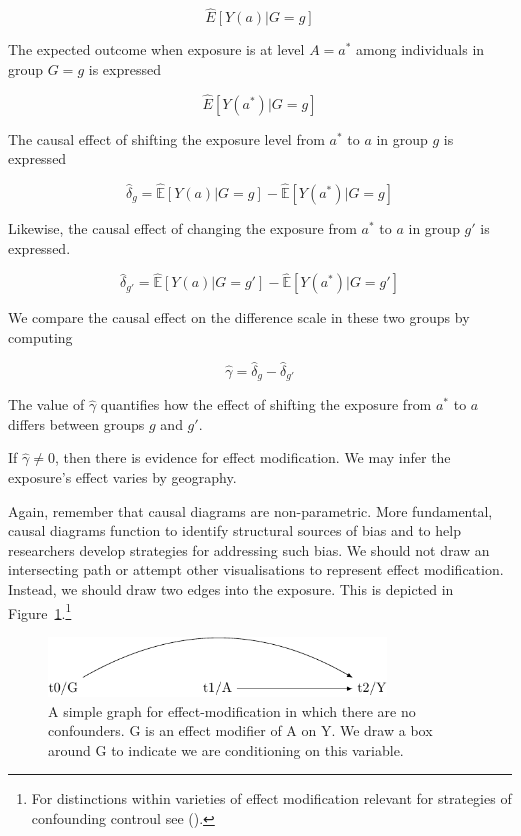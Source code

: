 \documentclass[
  singlecolumn,
  9pt]{article}
\begin{document}
\[\hat{E}[Y(a)|G=g]\]

The expected outcome when exposure is at level \(A=a^*\) among
individuals in group \(G=g\) is expressed

\[\hat{E}[Y(a^*)|G=g]\]

The causal effect of shifting the exposure level from \(a^*\) to \(a\)
in group \(g\) is expressed

\[\hat{\delta}_g = \hat{\mathbb{E}}[Y(a)|G=g] - \hat{\mathbb{E}}[Y(a^*)|G=g]\]

Likewise, the causal effect of changing the exposure from \(a^*\) to
\(a\) in group \(g'\) is expressed.

\[\hat{\delta}_{g'} = \hat{\mathbb{E}}[Y(a)|G=g'] - \hat{\mathbb{E}}[Y(a^*)|G=g']\]

We compare the causal effect on the difference scale in these two groups
by computing

\[\hat{\gamma} = \hat{\delta}_g - \hat{\delta}_{g'}\]

The value of \(\hat{\gamma}\) quantifies how the effect of shifting the
exposure from \(a^*\) to \(a\) differs between groups \(g\) and \(g'\).

If \(\hat{\gamma}\neq 0\), then there is evidence for effect
modification. We may infer the exposure's effect varies by geography.

Again, remember that causal diagrams are non-parametric. More
fundamental, causal diagrams function to identify structural sources of
bias and to help researchers develop strategies for addressing such
bias. We should not draw an intersecting path or attempt other
visualisations to represent effect modification. Instead, we should draw
two edges into the exposure. This is depicted in
Figure~\ref{fig-dag-effect-modfication}.\footnote{For distinctions
  within varieties of effect modification relevant for strategies of
  confounding controul see ().}

\begin{figure}

{\centering \includegraphics[width=0.8\textwidth,height=\textheight]{causal-dags_files/figure-pdf/fig-dag-effect-modfication-1.pdf}

}

\caption{\label{fig-dag-effect-modfication}A simple graph for
effect-modification in which there are no confounders. G is an effect
modifier of A on Y. We draw a box around G to indicate we are
conditioning on this variable.}

\end{figure}
\end{document}
